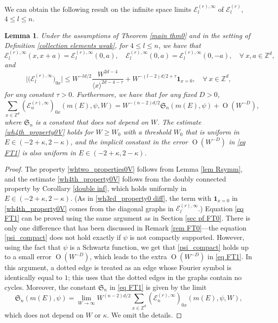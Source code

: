 \documentclass{article}
\newcommand{\1}{\mathds{1}}
\numberwithin{equation}{section}
\newcommand{\be}{\begin{equation}}
\newcommand{\ee}{\end{equation}}
\renewcommand{\leq}{\leqslant}
\renewcommand{\geq}{\geqslant}
\renewcommand{\le}{\leq}
\renewcommand{\ge}{\geq}
\newcommand{\Z}{\mathbb{Z}}
\DeclareMathOperator{\OO}{O}
\theoremstyle{plain} %
\newtheorem{lemma}[theorem]{Lemma}
\theoremstyle{remark}
\newcommand{\Sele}{{\mathcal E}}
\newcommand{\Sint}{\mathfrak S}
\begin{document}
We can obtain the following result on the infinite space limits $ \Sele^{(r),\infty}_{l}$ of $ \Sele_l^{(r)}$, $4\le l \le n$.
\begin{lemma}\label{lem FT1}
Under the assumptions of Theorem \ref{main thm0} and in the setting of Definition \ref{collection elements weak},  for $4\le l \le n$, we have that 
 \be\label{whtwo_properties0V}
 \Sele^{(r),\infty}_{l}(x, x+a) =  \Sele^{(r),\infty}_{l}(0,a), \quad   \Sele^{(r),\infty}_{l}(0, a) = \Sele^{(r),\infty}_{l} (0,-a), \quad \forall \ x,a\in \Z^d,
\ee 
and
\be\label{wh4th_property0V}
\big| \big( \Sele^{(r),\infty}_{l}\big)_{0x} \big| \le W^{-ld/2} \frac{W^{2d-4} }{\langle x\rangle^{2d-4-\tau}} + W^{-(l-2)d/2+\tau}\mathbf 1_{x=0}, \quad \forall \ x\in \Z^d, 
\ee
for any constant $\tau>0$. Furthermore, we have that for any fixed $D>0$, %
\be\label{eq FT1}\sum_{x\in \Z^d}(\Sele^{(r),\infty}_{n})_{0x}(m(E), \psi, W) =  W^{-(n-2)d/2} {\Sint}_{n}(m(E), \psi)  +\OO(W^{-D}),\ee
where ${\Sint}_{n}$ is a constant that does not depend on $W$. %
The estimate \eqref{wh4th_property0V} holds for $W\ge W_0$ with a threshold $W_0$ that is uniform in $E\in (-2+\kappa,2-\kappa)$, and the implicit constant in the error $\OO(W^{-D})$ in \eqref{eq FT1} is also uniform in $E\in (-2+\kappa,2-\kappa)$.
\end{lemma}
\begin{proof}
The property \eqref{whtwo_properties0V} follows from Lemma \ref{lem Rsymm}, and the estimate \eqref{wh4th_property0V} follows from the doubly connected property by Corollary \ref{double inf}, which holds uniformly in $E\in (-2+\kappa,2-\kappa)$. (As in \eqref{wh3rd_property0 diff}, the term with $\mathbf 1_{x=0}$ in \eqref{wh4th_property0V} comes from the diagonal graphs in $\Sele^{(r),\infty}_{l}$.) Equation \eqref{eq FT1} can be proved using the same argument as in Section \ref{sec pf FT0}. There is only one difference that has been discussed in Remark \ref{rem FT0}---the equation \eqref{psi_compact} does not hold exactly if $\psi$ is not compactly supported. However, using the fact that $\psi$ is a Schwartz function, we get that \eqref{psi_compact} holds up to a small error $\OO(W^{-D})$, which  leads to the extra $\OO(W^{-D})$ in \eqref{eq FT1}. In this argument, a dotted edge is treated as an edge whose Fourier symbol is identically equal to $1$; this uses that the dotted edges in the graphs contain no cycles. Moreover, the constant ${\Sint}_{n}$ in \eqref{eq FT1} is given by the limit
$${\Sint}_{n}(m(E), \psi)=\lim_{W\to \infty} W^{(n-2)d/2}\sum_{x\in \Z^d}(\Sele^{(r),\infty}_{n})_{0x}(m(E), \psi, W),$$
which does not depend on $W$ or $\kappa$. We omit the details.
\end{proof}
\end{document}
